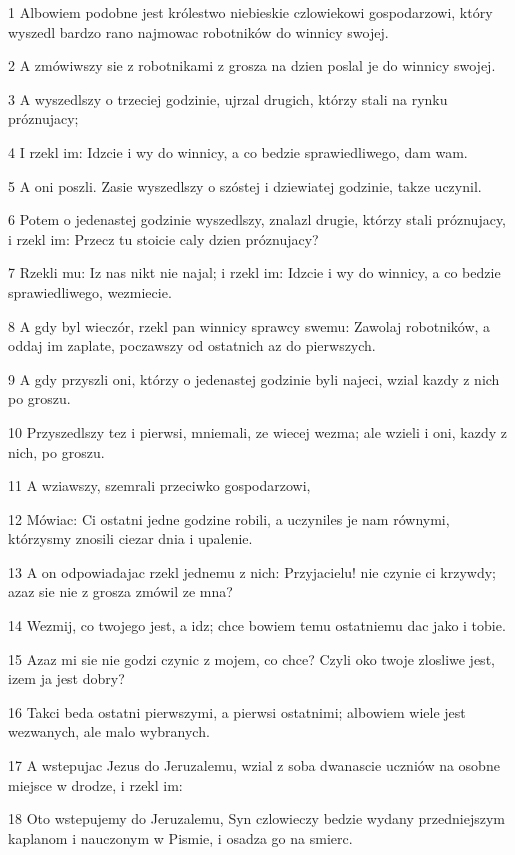 \par 1 Albowiem podobne jest królestwo niebieskie czlowiekowi gospodarzowi, który wyszedl bardzo rano najmowac robotników do winnicy swojej.
\par 2 A zmówiwszy sie z robotnikami z grosza na dzien poslal je do winnicy swojej.
\par 3 A wyszedlszy o trzeciej godzinie, ujrzal drugich, którzy stali na rynku próznujacy;
\par 4 I rzekl im: Idzcie i wy do winnicy, a co bedzie sprawiedliwego, dam wam.
\par 5 A oni poszli. Zasie wyszedlszy o szóstej i dziewiatej godzinie, takze uczynil.
\par 6 Potem o jedenastej godzinie wyszedlszy, znalazl drugie, którzy stali próznujacy, i rzekl im: Przecz tu stoicie caly dzien próznujacy?
\par 7 Rzekli mu: Iz nas nikt nie najal; i rzekl im: Idzcie i wy do winnicy, a co bedzie sprawiedliwego, wezmiecie.
\par 8 A gdy byl wieczór, rzekl pan winnicy sprawcy swemu: Zawolaj robotników, a oddaj im zaplate, poczawszy od ostatnich az do pierwszych.
\par 9 A gdy przyszli oni, którzy o jedenastej godzinie byli najeci, wzial kazdy z nich po groszu.
\par 10 Przyszedlszy tez i pierwsi, mniemali, ze wiecej wezma; ale wzieli i oni, kazdy z nich, po groszu.
\par 11 A wziawszy, szemrali przeciwko gospodarzowi,
\par 12 Mówiac: Ci ostatni jedne godzine robili, a uczyniles je nam równymi, którzysmy znosili ciezar dnia i upalenie.
\par 13 A on odpowiadajac rzekl jednemu z nich: Przyjacielu! nie czynie ci krzywdy; azaz sie nie z grosza zmówil ze mna?
\par 14 Wezmij, co twojego jest, a idz; chce bowiem temu ostatniemu dac jako i tobie.
\par 15 Azaz mi sie nie godzi czynic z mojem, co chce? Czyli oko twoje zlosliwe jest, izem ja jest dobry?
\par 16 Takci beda ostatni pierwszymi, a pierwsi ostatnimi; albowiem wiele jest wezwanych, ale malo wybranych.
\par 17 A wstepujac Jezus do Jeruzalemu, wzial z soba dwanascie uczniów na osobne miejsce w drodze, i rzekl im:
\par 18 Oto wstepujemy do Jeruzalemu, Syn czlowieczy bedzie wydany przedniejszym kaplanom i nauczonym w Pismie, i osadza go na smierc.
